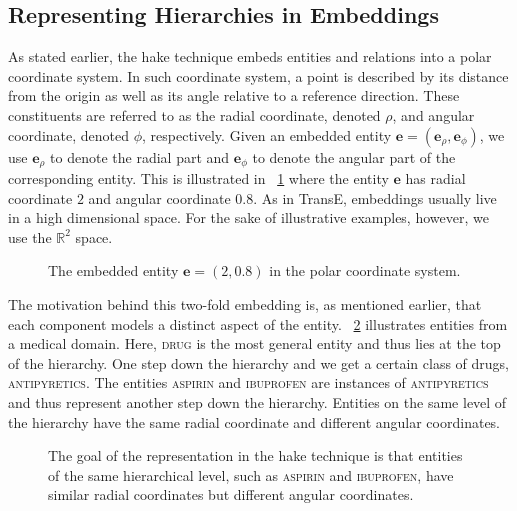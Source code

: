 \subsection{Representing Hierarchies in Embeddings}\label{sec:representing-hieraricies}

As stated earlier, the \ac{hake} technique embeds entities and relations into a polar coordinate system.
In such coordinate system, a point is described by its distance from the origin as well as its angle relative to a reference direction.
These constituents are referred to as the radial coordinate, denoted $\rho$, and angular coordinate, denoted $\phi$, respectively.
Given an embedded entity $\bm{e} = (\bm{e}_\rho, \bm{e}_\phi)$, we use $\bm{e}_\rho$ to denote the radial part and $\bm{e}_\phi$ to denote the angular part of the corresponding entity.
This is illustrated in \figurename~\ref{fig:polar} where the entity $\bm{e}$ has radial coordinate $2$ and angular coordinate $0.8$.
As in TransE, embeddings usually live in a high dimensional space.
For the sake of illustrative examples, however, we use the $\mathbb{R}^2$ space.

\begin{figure}[ht]
  \centering\small
  
  \caption{The embedded entity $\bm{e} = (2, 0.8)$ in the polar coordinate system.}\label{fig:polar}
\end{figure}

The motivation behind this two-fold embedding is, as mentioned earlier, that each component models a distinct aspect of the entity.
\figurename~\ref{fig:hierarchy} illustrates entities from a medical domain.
Here, \textsc{drug} is the most general entity and thus lies at the top of the hierarchy.
One step down the hierarchy and we get a certain class of drugs, \textsc{antipyretics}.
The entities \textsc{aspirin} and \textsc{ibuprofen} are instances of \textsc{antipyretics} and thus represent another step down the hierarchy.
Entities on the same level of the hierarchy have the same radial coordinate and different angular coordinates.

\begin{figure}[ht]
  \centering\small
  
  \caption{The goal of the representation in the \ac{hake} technique is that entities of the same hierarchical level, such as \textsc{aspirin} and \textsc{ibuprofen}, have similar radial coordinates but different angular coordinates.}\label{fig:hierarchy}
\end{figure}

